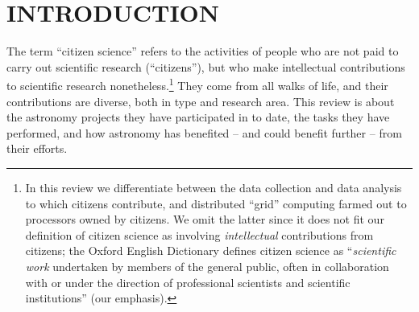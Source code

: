 \documentclass{ar2e}
\begin{document}
\maketitle


\section{INTRODUCTION}
\label{sec:intro}

The term ``citizen science'' refers to the activities of people who are not paid
to carry out scientific research (``citizens''), but who make intellectual
contributions to scientific research nonetheless.\footnote{%
In this review we differentiate between the data collection and data analysis to
which citizens contribute, and distributed ``grid'' computing farmed out to
processors owned by citizens. We omit the latter since it does not fit our
definition of citizen science as involving \textit{intellectual} contributions
from citizens; the Oxford English Dictionary defines citizen science as 
``\textit{scientific work} undertaken by members of the general public, often in
collaboration with or under the direction of professional scientists and
scientific institutions'' (our emphasis).} They come from all walks
of life, and their contributions are diverse, both in type and research area.
This review is about the astronomy projects they have participated in to date,
the tasks they have performed, and how astronomy has benefited -- and could
benefit further -- from their efforts.
\end{document}
